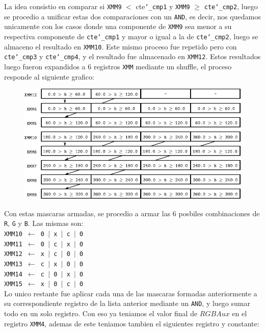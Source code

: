 La idea consistio en comparar si \texttt{XMM9} $<$ cte\texttt{\char`_cmp1} y \texttt{XMM9} $\geq$ \texttt{cte\char`_cmp2}, luego se procedio a unificar estas dos comparaciones con un \texttt{AND}, es decir, nos quedamos unicamente con los casos donde una componente de \texttt{XMM9} sea menor a su respectiva componente de \texttt{cte\char`_cmp1} y mayor o igual a la de \texttt{cte\char`_cmp2}, luego se almaceno el resultado en \texttt{XMM10}. Este mismo proceso fue repetido pero con \texttt{cte\char`_cmp3} y \texttt{cte\char`_cmp4}, y el resultado fue almacenado en \texttt{XMM12}. Estos resultados luego fueron expandidos a 6 registros \texttt{XMM} mediante un shuffle, el proceso responde al siguiente grafico:\\

\begin{figure}[!h]
	\centering
	\includegraphics[scale=1.25]{images/HSLASM1_2}
\end{figure}

Con estas mascaras armadas, se procedio a armar las 6 posbiles combinaciones de \texttt{R}, \texttt{G} y \texttt{B}. Las mismas son:\\

\noindent
\texttt{XMM10 $\gets$ 0 $\vert$ x $\vert$ c $\vert$ 0}\\
\texttt{XMM11 $\gets$ 0 $\vert$ c $\vert$ x $\vert$ 0}\\
\texttt{XMM12 $\gets$ x $\vert$ c $\vert$ 0 $\vert$ 0}\\
\texttt{XMM13 $\gets$ c $\vert$ x $\vert$ 0 $\vert$ 0}\\
\texttt{XMM14 $\gets$ c $\vert$ 0 $\vert$ x $\vert$ 0}\\
\texttt{XMM15 $\gets$ x $\vert$ 0 $\vert$ c $\vert$ 0}\\

Lo unico restante fue aplicar cada una de las mascaras formadas anteriormente a su correspondiente registro de la lista anterior mediante un \texttt{AND}, y luego sumar todo en un solo registro. Con eso ya teniamos el valor final de $RGBAux$ en el registro \texttt{XMM4}, ademas de este teniamos tambien el siguientes registro y constante:\\

